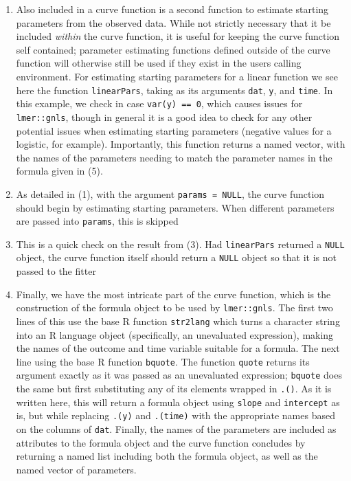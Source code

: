 \documentclass{article}
\newcommand{\xt}{\texttt}%
\begin{document}
\begin{enumerate}
\item Also included in a curve function is a second function to estimate starting parameters from the observed data. While not strictly necessary that it be included \textit{within} the curve function, it is useful for keeping the curve function self contained; parameter estimating functions defined outside of the curve function will otherwise still be used if they exist in the users calling environment. For estimating starting parameters for a linear function we see here the function \xt{linearPars}, taking as  its arguments \xt{dat}, \xt{y}, and \xt{time}. In this example, we check in case \xt{var(y) == 0}, which causes issues for \xt{lmer::gnls}, though in general it is a good idea to check for any other potential issues when estimating starting parameters (negative values for a logistic, for example). Importantly, this function returns a named vector, with the names of the parameters needing to match the parameter names in the formula given in (5). 
\item As detailed in (1), with the argument \xt{params = NULL}, the curve function should begin by estimating starting parameters. When different parameters are passed into \xt{params}, this is skipped
\item This is a quick check on the result from (3). Had \xt{linearPars} returned a \xt{NULL} object, the curve function itself should return a \xt{NULL} object so that it is not passed to the fitter
\item Finally, we have the most intricate part of the curve function, which is the construction of the formula object to be used by \xt{lmer::gnls}. The first two lines of this use the base R function \xt{str2lang} which turns a character string into an R language object (specifically, an unevaluated expression), making the names of the outcome and time variable suitable for a formula. The next line using the base R function \xt{bquote}. The function \xt{quote} returns its argument exactly as it was passed as an unevaluated expression; \xt{bquote} does the same but first substituting any of its elements wrapped in \xt{.()}. As it is written here, this will return a formula object using \xt{slope} and \xt{intercept} as is, but while replacing \xt{.(y)} and \xt{.(time)} with the appropriate names based on the columns of \xt{dat}. Finally, the names of the parameters are included as attributes to the formula object and the curve function concludes by returning a named list including both the formula object, as well as the named vector of parameters.
\end{enumerate}
\end{document}
